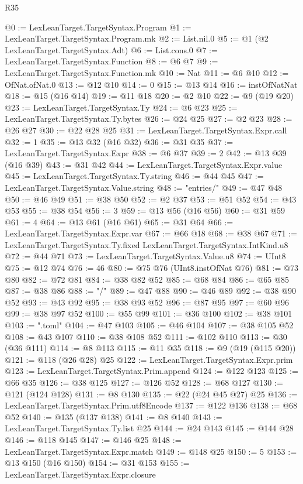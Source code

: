 \begin{lexlean}{R35}
\begin{coremodule}
@0 := LexLeanTarget.TargetSyntax.Program
@1 := LexLeanTarget.TargetSyntax.Program.mk
@2 := List.nil.{0}
@5 := @1 (@2 LexLeanTarget.TargetSyntax.Adt)
@6 := List.cons.{0}
@7 := LexLeanTarget.TargetSyntax.Function
@8 := @6 @7
@9 := LexLeanTarget.TargetSyntax.Function.mk
@10 := Nat
@11 := @6 @10
@12 := OfNat.ofNat.{0}
@13 := @12 @10
@14 := 0
@15 := @13 @14
@16 := instOfNatNat
@18 := @15 (@16 @14)
@19 := @11 @18
@20 := @2 @10
@22 := @9 (@19 @20)
@23 := LexLeanTarget.TargetSyntax.Ty
@24 := @6 @23
@25 := LexLeanTarget.TargetSyntax.Ty.bytes
@26 := @24 @25
@27 := @2 @23
@28 := @26 @27
@30 := @22 @28 @25
@31 := LexLeanTarget.TargetSyntax.Expr.call
@32 := 1
@35 := @13 @32 (@16 @32)
@36 := @31 @35
@37 := LexLeanTarget.TargetSyntax.Expr
@38 := @6 @37
@39 := 2
@42 := @13 @39 (@16 @39)
@43 := @31 @42
@44 := LexLeanTarget.TargetSyntax.Expr.value
@45 := LexLeanTarget.TargetSyntax.Ty.string
@46 := @44 @45
@47 := LexLeanTarget.TargetSyntax.Value.string
@48 := "entries/"
@49 := @47 @48
@50 := @46 @49
@51 := @38 @50
@52 := @2 @37
@53 := @51 @52
@54 := @43 @53
@55 := @38 @54
@56 := 3
@59 := @13 @56 (@16 @56)
@60 := @31 @59
@61 := 4
@64 := @13 @61 (@16 @61)
@65 := @31 @64
@66 := LexLeanTarget.TargetSyntax.Expr.var
@67 := @66 @18
@68 := @38 @67
@71 := LexLeanTarget.TargetSyntax.Ty.fixed LexLeanTarget.TargetSyntax.IntKind.u8
@72 := @44 @71
@73 := LexLeanTarget.TargetSyntax.Value.u8
@74 := UInt8
@75 := @12 @74
@76 := 46
@80 := @75 @76 (UInt8.instOfNat @76)
@81 := @73 @80
@82 := @72 @81
@84 := @38 @82 @52
@85 := @68 @84
@86 := @65 @85
@87 := @38 @86
@88 := "/"
@89 := @47 @88
@90 := @46 @89
@92 := @38 @90 @52
@93 := @43 @92
@95 := @38 @93 @52
@96 := @87 @95
@97 := @60 @96
@99 := @38 @97 @52
@100 := @55 @99
@101 := @36 @100
@102 := @38 @101
@103 := ".toml"
@104 := @47 @103
@105 := @46 @104
@107 := @38 @105 @52
@108 := @43 @107
@110 := @38 @108 @52
@111 := @102 @110
@113 := @30 (@36 @111)
@114 := @8 @113
@115 := @11 @35
@118 := @9 (@19 (@115 @20))
@121 := @118 (@26 @28) @25
@122 := LexLeanTarget.TargetSyntax.Expr.prim
@123 := LexLeanTarget.TargetSyntax.Prim.append
@124 := @122 @123
@125 := @66 @35
@126 := @38 @125
@127 := @126 @52
@128 := @68 @127
@130 := @121 (@124 @128)
@131 := @8 @130
@135 := @22 (@24 @45 @27) @25
@136 := LexLeanTarget.TargetSyntax.Prim.utf8Encode
@137 := @122 @136
@138 := @68 @52
@140 := @135 (@137 @138)
@141 := @8 @140
@143 := LexLeanTarget.TargetSyntax.Ty.list @25
@144 := @24 @143
@145 := @144 @28
@146 := @118 @145
@147 := @146 @25
@148 := LexLeanTarget.TargetSyntax.Expr.match
@149 := @148 @25
@150 := 5
@153 := @13 @150 (@16 @150)
@154 := @31 @153
@155 := LexLeanTarget.TargetSyntax.Expr.closure

\end{coremodule}
\end{lexlean}
